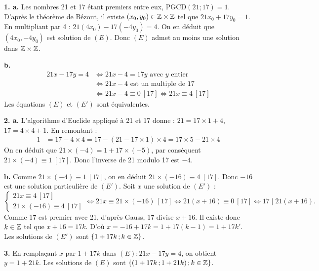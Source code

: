 \documentclass[11pt]{article}
\begin{document}


\textbf{1. a.} Les nombres 21 et 17 étant premiers entre eux, $\mathrm{PGCD}(21;17) = 1$. D'après le théorème de Bézout, il existe $(x_0, y_0) \in \mathbb{Z} \times \mathbb{Z}$ tel que $21x_0 + 17y_0 = 1$. En multipliant par 4 : $21(4x_0) - 17(-4y_0) = 4$. On en déduit que $(4x_0, -4y_0)$ est solution de $(E)$. Donc $(E)$ admet au moins une solution dans $\mathbb{Z} \times \mathbb{Z}$.

\textbf{b.}
\begin{align*}
21x - 17y = 4 &\Longleftrightarrow 21x - 4 = 17y \text{ avec } y \text{ entier} \\
&\Longleftrightarrow 21x - 4 \text{ est un multiple de } 17 \\
&\Longleftrightarrow 21x - 4 \equiv 0\ [17] \Longleftrightarrow 21x \equiv 4\ [17]
\end{align*}
Les équations $(E)$ et $(E')$ sont équivalentes.

\textbf{2. a.} L'algorithme d'Euclide appliqué à 21 et 17 donne : $21 = 17 \times 1 + 4$, $17 = 4 \times 4 + 1$. En remontant :
\begin{align*}
1 &= 17 - 4 \times 4 = 17 - (21 - 17 \times 1) \times 4 = 17 \times 5 - 21 \times 4
\end{align*}
On en déduit que $21 \times (-4) = 1 + 17 \times (-5)$, par conséquent $21 \times (-4) \equiv 1\ [17]$. Donc l'inverse de 21 modulo 17 est $-4$.

\textbf{b.} Comme $21 \times (-4) \equiv 1\ [17]$, on en déduit $21 \times (-16) \equiv 4\ [17]$. Donc $-16$ est une solution particulière de $(E')$. Soit $x$ une solution de $(E')$ :
\[ \begin{cases} 21x \equiv 4\ [17] \\ 21 \times (-16) \equiv 4\ [17] \end{cases} \Longleftrightarrow 21x \equiv 21 \times (-16)\ [17] \Longleftrightarrow 21(x + 16) \equiv 0\ [17] \Longleftrightarrow 17 \mid 21(x + 16). \]
Comme 17 est premier avec 21, d'après Gauss, 17 divise $x + 16$. Il existe donc $k \in \mathbb{Z}$ tel que $x + 16 = 17k$. D'où $x = -16 + 17k = 1 + 17(k - 1) = 1 + 17k'$. Les solutions de $(E')$ sont $\{1 + 17k\,;k \in \mathbb{Z}\}$.

\textbf{3.} En remplaçant $x$ par $1 + 17k$ dans $(E) : 21x - 17y = 4$, on obtient $y = 1 + 21k$. Les solutions de $(E)$ sont $\{(1 + 17k\,;1 + 21k)\,;k \in \mathbb{Z}\}$.
\end{document}
